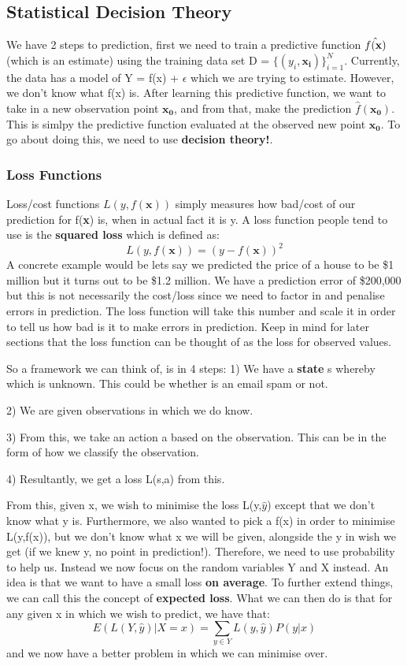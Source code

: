 \documentclass[11pt, oneside]{article}
\def\dataset{\text{$\{(y_i, {\bm{x_i}})\}_{i=1}^N$}}
\theoremstyle{definition}
\begin{document}
\subsection{Statistical Decision Theory}
We have 2 steps to prediction, first we need to train a predictive function $\hat{f(\bf{x})}$ (which is an estimate) using the training data set D = $\dataset$. Currently, the data has a model of Y = f(x) + $\epsilon$ which we are trying to estimate. However, we don't know what f(x) is. After learning this predictive function, we want to take in a new observation point $\bm{x_0}$, and from that, make the prediction $\hat{f}(\bm{x_{0}})$. This is simlpy the predictive function evaluated at the observed new point $\bm{x_0}$. To go about doing this, we need to use \textbf{decision theory!}.

\subsubsection{Loss Functions}
Loss/cost functions $L(y, f(\bm{x}))$ simply measures how bad/cost of our prediction for f(\textbf{x}) is, when in actual fact it is y. A loss function people tend to use is the \textbf{squared loss} which is defined as:
$$
L(y, f(\bm{x})) = (y - f(\bm{x}))^2
$$
A concrete example would be lets say we predicted the price of a house to be \$1 million but it turns out to be \$1.2 million. We have a prediction error of \$200,000 but this is not necessarily the cost/loss since we need to factor in and penalise errors in prediction. The loss function will take this number and scale it in order to tell us how bad is it to make errors in prediction. Keep in mind for later sections that the loss function can be thought of as the loss for observed values.

So a framework we can think of, is in 4 steps:
1) We have a \textbf{state} s whereby which is unknown. This could be whether is an email spam or not.

2) We are given observations in which we do know.

3) From this, we take an action a based on the observation. This can be in the form of how we classify the observation.

4) Resultantly, we get a loss L(s,a) from this.

From this, given x, we wish to minimise the loss L(y,$\hat{y}$) except that we don't know what y is. Furthermore, we also wanted to pick a f(x) in order to minimise L(y,f(x)), but we don't know what x we will be given, alongside the y in wish we get (if we knew y, no point in prediction!). Therefore, we need to use probability to help us. Instead we now focus on the random variables Y and X instead. An idea is that we want to have a small loss \textbf{on average}. To further extend things, we can call this the concept of \textbf{expected loss}. What we can then do is that for any given x in which we wish to predict, we have that:
$$
E(L(Y,\hat{y})|X=x) = \sum\limits_{y \in Y}L(y,\hat{y})P(y|x)
$$
and we now have a better problem in which we can minimise over.
\end{document}
